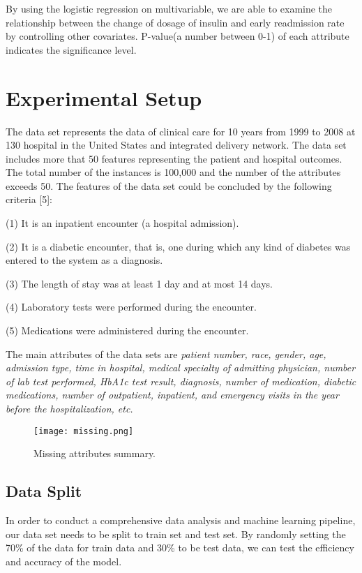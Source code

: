 \documentclass[twoside,11pt]{article}
\begin{document}
By using the logistic regression on multivariable, we are able to examine the relationship between the change of dosage of insulin and early readmission rate by controlling other covariates. P-value(a number between 0-1) of each attribute indicates the significance level.


\section{Experimental Setup} \label{experiment}
The data set represents the data of clinical care for 10 years from 1999 to 2008 at 130 hospital in the United States and integrated delivery network. The data set includes more that 50 features representing the patient and hospital outcomes. The total number of the instances is 100,000 and the number of the attributes exceeds 50. The features of the data set could be concluded by the following criteria [5]: 

(1)	It is an inpatient encounter (a hospital admission).

(2)	It is a diabetic encounter, that is, one during which any kind of diabetes was entered to the system as a diagnosis.

(3)	The length of stay was at least 1 day and at most 14 days.

(4)	Laboratory tests were performed during the encounter.

(5)	Medications were administered during the encounter.

\vspace{0.5em}

The main attributes of the data sets are \emph{patient number, race, gender, age, admission type, time in hospital, medical specialty of admitting physician, number of lab test performed, HbA1c test result, diagnosis, number of medication, diabetic medications, number of outpatient, inpatient, and emergency visits in the year before the hospitalization, etc.}

\begin{figure}[htbp]
  \centering 
  \texttt{[image: missing.png]} 
  \caption{Missing attributes summary.}
  \label{fig:example} 
\end{figure} 


\subsection{Data Split} 
In order to conduct a comprehensive data analysis and machine learning pipeline, our data set needs to be split to train set and test set. By randomly setting the 70\% of the data for train data and 30\% to be test data, we can test the efficiency and accuracy of the model. 
\end{document}
